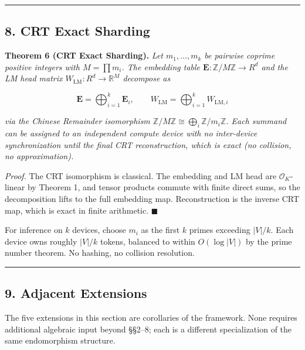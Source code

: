 \documentclass[
  11pt,
]{article}
\begin{document}
\begin{center}\rule{0.5\linewidth}{0.5pt}\end{center}

\hypertarget{crt-exact-sharding}{%
\subsection{8. CRT Exact Sharding}\label{crt-exact-sharding}}

\textbf{Theorem 6 (CRT Exact Sharding).} \emph{Let \(m_1, \dots, m_k\)
be pairwise coprime positive integers with \(M = \prod m_i\). The
embedding table \(\mathbf{E} : \mathbb{Z}/M\mathbb{Z} \to R^d\) and the
LM head matrix \(W_{\mathrm{LM}} : R^d \to \mathbb{R}^M\) decompose as}

\[\mathbf{E} = \bigoplus_{i=1}^k \mathbf{E}_i, \qquad W_{\mathrm{LM}} = \bigoplus_{i=1}^k W_{\mathrm{LM}, i}\]

\emph{via the Chinese Remainder isomorphism
\(\mathbb{Z}/M\mathbb{Z} \cong \bigoplus_i \mathbb{Z}/m_i\mathbb{Z}\).
Each summand can be assigned to an independent compute device with no
inter-device synchronization until the final CRT reconstruction, which
is exact (no collision, no approximation).}

\emph{Proof.} The CRT isomorphism is classical. The embedding and LM
head are \(\mathcal{O}_K\)-linear by Theorem 1, and tensor products
commute with finite direct sums, so the decomposition lifts to the full
embedding map. Reconstruction is the inverse CRT map, which is exact in
finite arithmetic. \(\blacksquare\)

For inference on \(k\) devices, choose \(m_i\) as the first \(k\) primes
exceeding \(|V|/k\). Each device owns roughly \(|V|/k\) tokens, balanced
to within \(O(\log |V|)\) by the prime number theorem. No hashing, no
collision resolution.

\begin{center}\rule{0.5\linewidth}{0.5pt}\end{center}

\hypertarget{adjacent-extensions}{%
\subsection{9. Adjacent Extensions}\label{adjacent-extensions}}

The five extensions in this section are corollaries of the framework.
None requires additional algebraic input beyond §§2--8; each is a
different specialization of the same endomorphism structure.
\end{document}
